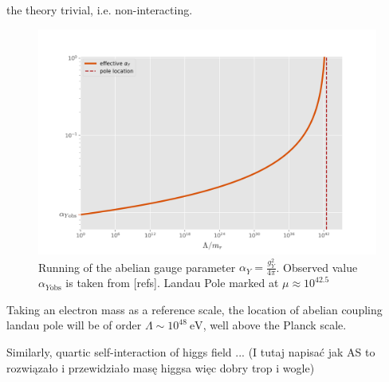 \documentclass[11pt, a4paper]{article}
\begin{document}
the theory trivial, i.e. non-interacting.
\begin{figure}[H]
    \includegraphics[width=1\textwidth]{../plotr.jpg}
    \caption{Running of the abelian gauge parameter $\alpha_Y = \frac{g_Y^2}{4\pi}$. Observed value $\alpha_{Y\text{obs}}$ is taken from [refs]. 
    Landau Pole marked at $\mu \approx 10^{42.5}$}
    \label{boxes}
\end{figure} 
Taking an electron mass as a reference scale, the location of abelian coupling landau pole will be of order $\Lambda \sim 10^{48} \ \text{eV}$, well above the Planck scale.

Similarly, quartic self-interaction of higgs field ...
(I tutaj napisać jak AS to rozwiązało i przewidziało masę higgsa więc dobry trop i wogle)

\end{document}
